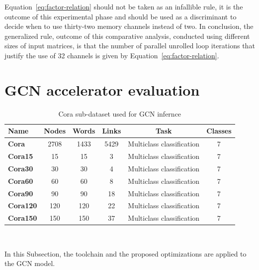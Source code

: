 Equation~\ref{eq:factor-relation} should not be taken as an infallible rule, it is the outcome of this experimental phase and should be used as a discriminant to decide when to use thirty-two memory channels instead of two.
In conclusion, the generalized rule, outcome of this comparative analysis, conducted using different sizes of input matrices, is that the number of parallel unrolled loop iterations that justify the use of 32 channels is given by Equation~\ref{eq:factor-relation}.

\section{GCN accelerator evaluation}
\label{sec:gcn_accelerator_evaluation}%

\begin{table}[t]
\centering
    \begin{tabular}{|p{4em} c c c c c|}
    \hline
    \textbf{Name} & \textbf{Nodes} & \textbf{Words} & \textbf{Links} & \textbf{Task} & \textbf{Classes} \T\B \\
    \hline \hline
    \textbf{Cora} & 2708  & 1433 & 5429 & Multiclass classification & 7 \T\B\\
    \hline
    \textbf{Cora15} & 15  & 15 & 3 & Multiclass classification & 7 \T\B\\
    \hline
    \textbf{Cora30} & 30  & 30 & 4 & Multiclass classification & 7 \T\B\\
    \hline
    \textbf{Cora60} & 60  & 60 & 8 & Multiclass classification & 7 \T\B\\
    \hline
    \textbf{Cora90} & 90  & 90 & 18 & Multiclass classification & 7 \T\B\\
    \hline
    \textbf{Cora120} & 120  & 120 & 22 & Multiclass classification & 7 \T\B\\
    \hline
    \textbf{Cora150} & 150  & 150 & 37 & Multiclass classification & 7 \T\B\\
    \hline
    \end{tabular}
    \\[10pt]
    \caption{Cora sub-dataset used for GCN infernce}
    \label{tab:dataset-definition}
\end{table}

In this Subsection, the toolchain and the proposed optimizations are applied to the GCN model.

